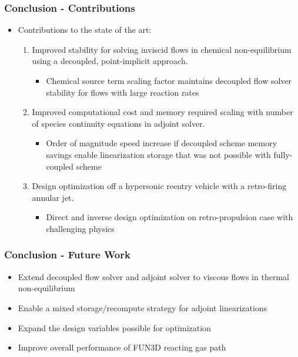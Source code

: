 \documentclass{beamer}
\begin{document}
\begin{frame}
  \frametitle{Conclusion - Contributions}
  \begin{itemize}
    \item Contributions to the state of the art:
      \begin{enumerate}
        \item<1-> Improved stability for solving inviscid flows in chemical
          non-equilibrium using a decoupled, point-implicit approach.
          \begin{itemize}
            \item Chemical source term scaling factor maintains decoupled flow
              solver stability for flows with large reaction rates
          \end{itemize}
        \item<2-> Improved computational cost and memory required scaling with
          number of species continuity equations in adjoint solver.
          \begin{itemize}
            \item Order of magnitude speed increase if decoupled scheme memory
              savings enable linearization storage that was not possible with
              fully-coupled scheme
          \end{itemize}
        \item<3-> Design optimization off a hypersonic reentry vehicle with a
          retro-firing annular jet.
          \begin{itemize}
            \item Direct and inverse design optimization on retro-propulsion
              case with challenging physics
          \end{itemize}
      \end{enumerate}
  \end{itemize}
\end{frame}

\begin{frame}
  \frametitle{Conclusion - Future Work}
  \begin{itemize}
    \item Extend decoupled flow solver and adjoint solver to viscous flows in
      thermal non-equilibrium
    \item Enable a mixed storage/recompute strategy for adjoint linearizations
    \item Expand the design variables possible for optimization
    \item Improve overall performance of FUN3D reacting gas path
  \end{itemize}
\end{frame}
\end{document}
